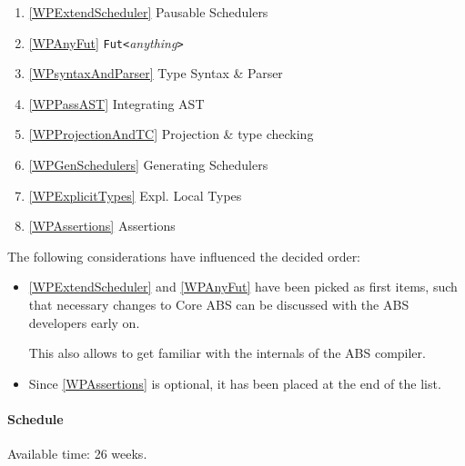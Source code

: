 \documentclass[paper=a4,nochapname,accentcolor=tud9c]{tudexercise}
\begin{document}
\begin{enumerate}[label=(\arabic*)]
  \item \label{orderExtendScheduler} \ref{WPExtendScheduler} Pausable Schedulers
  \item \label{orderAnyFut} \ref{WPAnyFut} \texttt{Fut<}\emph{anything}\texttt{>}
  \item \label{ordersyntaxAndParser} \ref{WPsyntaxAndParser} Type Syntax \& Parser
  \item \label{orderPassAST} \ref{WPPassAST} Integrating AST
  \item \label{orderProjectionAndTC} \ref{WPProjectionAndTC} Projection \& type checking
  \item \label{orderGenSchedulers} \ref{WPGenSchedulers} Generating Schedulers
  \item \label{orderExplicitTypes} \ref{WPExplicitTypes} Expl. Local Types
  \item \label{orderAssertions} \ref{WPAssertions} Assertions
\end{enumerate}

The following considerations have influenced the decided order:
\begin{itemize}
  \item \ref{WPExtendScheduler} and \ref{WPAnyFut} have been picked as first items, such that necessary changes to Core ABS can be discussed with the ABS developers early on.

    This also allows to get familiar with the internals of the ABS compiler.
  \item Since \ref{WPAssertions} is optional, it has been placed at the end of
    the list.
\end{itemize}

\paragraph{Schedule}%
Available time: 26 weeks.
\end{document}
